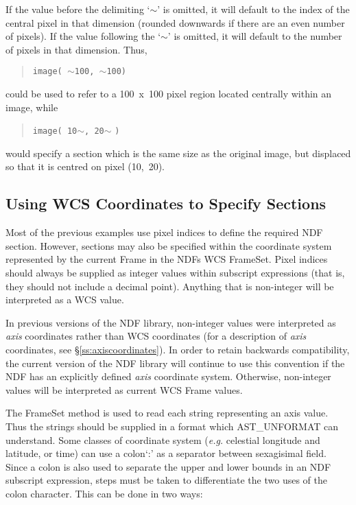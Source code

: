 \documentclass[twoside,11pt]{article}
\newcommand{\xref}[3]{#1}
\newcommand{\xlabel}[1]{}
\newcommand{\st}[1]{{\em{#1}}}
\newcommand{\hi}[1]{{\tt{#1}}}
\begin{document}
If the value before the delimiting `$\sim$' is omitted, it will default to the
index of the central pixel in that dimension (rounded downwards if there are an
even number of pixels). If the value following the `$\sim$' is omitted, it will
default to the number of pixels in that dimension. Thus,

\small
\begin{quote}
\begin{center}
\hi{image( }$\sim$\hi{100, }$\sim$\hi{100)}
\end{center}
\end{quote}
\normalsize

could be used to refer to a 100~x~100 pixel region located centrally within an
image, while

\small
\begin{quote}
\begin{center}
\hi{image( 10}$\sim$\hi{, 20}$\sim$ \hi{)}
\end{center}
\end{quote}
\normalsize

would specify a section which is the same size as the original image, but
displaced so that it is centred on pixel (10,~20).

\subsection{\xlabel{using_axis_coordinates_to_specify_sections}\label{ss:axissections}Using
WCS Coordinates to Specify Sections}

Most of the previous examples use pixel indices to define the required
NDF section. However, sections may also be specified within the coordinate 
system represented by the current Frame in the NDFs WCS FrameSet. Pixel
indices should always be supplied as integer values within subscript 
expressions (that is, they should not include a decimal point). Anything 
that is non-integer will be interpreted as a WCS value.

In previous versions of the NDF library, non-integer values were interpreted 
as \st{axis\/} coordinates rather than WCS coordinates (for a description of 
\st{axis\/} coordinates, see \S\ref{ss:axiscoordinates}). In order to
retain backwards compatibility, the current version of the NDF library
will continue to use this convention if the NDF has an explicitly 
defined \st{axis\/} coordinate system. Otherwise, non-integer values will
be interpreted as  current WCS Frame values.

The \xref{FrameSet}{sun210}{AST_UNFORMAT} method is used to read each
string representing an axis value. Thus the strings should be supplied in
a format which AST\_UNFORMAT can understand. Some classes of coordinate
system (\st{e.g.\/} celestial longitude and latitude, or time) can use a
colon`:' as a separator between sexagisimal field. Since a colon is also
used to separate the upper and lower bounds in an NDF subscript expression,
steps must be taken to differentiate the two uses of the colon character. 
This can be done in two ways:
\end{document}

